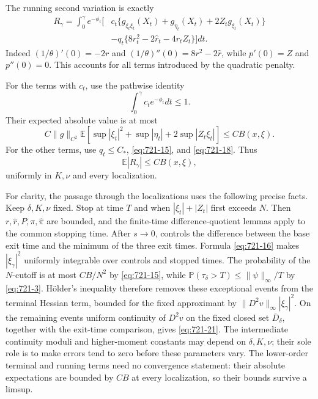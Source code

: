 \documentclass[11pt,a4paper]{article}
\theoremstyle{remark}
\begin{document}
The running second variation is exactly
\begin{equation}
 \begin{split}
 R_\gamma=\int_0^\gamma e^{-\phi_t}\bigl[
 &c_t\{g_{\xi_t\xi_t}(X_t)+g_{\eta_t}(X_t)
                   +2Z_tg_{\xi_t}(X_t)\}\\
 &-q_t\{8r_t^2-2\widehat r_t-4r_tZ_t\}\bigr]dt.
 \end{split}
 \label{eq:721-27}
\end{equation}
Indeed $(1/\theta)'(0)=-2r$ and
$(1/\theta)''(0)=8r^2-2\widehat r$, while $p'(0)=Z$ and $p''(0)=0$.
This accounts for all terms introduced by the quadratic penalty.

For the terms with $c_t$, use the pathwise identity
\[
 \int_0^\gamma c_te^{-\phi_t}dt\le1.
\]
Their expected absolute value is at most
\[
 C\|g\|_{C^2}\mathbb E\left[
 \sup|\xi_t|^2+\sup|\eta_t|+2\sup|Z_t\xi_t|
 \right]\le CB(x,\xi).
\]
For the other terms, use $q_t\le C_*$, \eqref{eq:721-15}, and \eqref{eq:721-18}.
Thus
\begin{equation}
 \mathbb E|R_\gamma|\le CB(x,\xi),
 \label{eq:721-28}
\end{equation}
uniformly in $K,\nu$ and every localization.

For clarity, the passage through the localizations uses the following precise
facts.  Keep $\delta,K,\nu$ fixed.  Stop at time $T$ and when
$|\xi_t|+|Z_t|$ first exceeds $N$.  Then $r,\widehat r,P,\pi,\widehat\pi$
are bounded, and the finite-time difference-quotient lemmas apply to the
common stopping time.  After $s\to0$, \cite[Lemma 6.4]{ZhouBellman2015}
controls the difference between the base exit time and the minimum of the
three exit times.  Formula \eqref{eq:721-16} makes $|\xi_\gamma|^2$ uniformly
integrable over controls and stopped times.  The probability of the
$N$-cutoff is at most $CB/N^2$ by \eqref{eq:721-15}, while
$\mathbb P(\tau_\delta>T)\le\|\psi\|_\infty/T$ by \eqref{eq:721-3}.
H\"older's inequality therefore removes these exceptional events from the
terminal Hessian term, bounded for the fixed approximant by
$\|D^2v\|_\infty|\xi_\gamma|^2$.
On the remaining events uniform continuity of $D^2v$ on the fixed closed
set $\overline D_\delta$, together with the exit-time comparison, gives
\eqref{eq:721-21}.  The intermediate continuity moduli and higher-moment constants
may depend on $\delta,K,\nu$; their sole role is to make errors tend to zero
before these parameters vary.  The lower-order terminal and running terms
need no convergence statement: their absolute expectations are bounded by
$CB$ at every localization, so their bounds survive a limsup.
\end{document}
